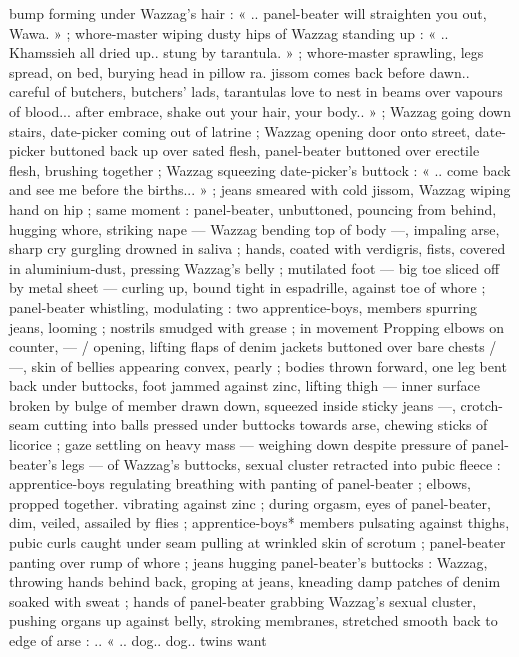 bump forming under Wazzag’s hair : « .. panel-beater will straighten
you out, Wawa. » ; whore-master wiping dusty hips of Wazzag
standing up : « .. Khamssieh all dried up.. stung by tarantula. » ;
whore-master sprawling, legs spread, on bed, burying head in pillow
ra. jissom comes back before dawn.. careful of butchers, butchers’
lads, tarantulas love to nest in beams over vapours of blood... after
embrace, shake out your hair, your body.. » ; Wazzag going down
stairs, date-picker coming out of latrine ; Wazzag opening door onto
street, date-picker buttoned back up over sated flesh, panel-beater
buttoned over erectile flesh, brushing together ; Wazzag squeezing
date-picker's buttock : « .. come back and see me before the births...
» ; jeans smeared with cold jissom, Wazzag wiping hand on hip ; same
moment : panel-beater, unbuttoned, pouncing from behind, hugging
whore, striking nape --- Wazzag bending top of body ---, impaling
arse, sharp cry gurgling drowned in saliva ; hands, coated with
verdigris, fists, covered in aluminium-dust, pressing Wazzag's belly ;
mutilated foot --- big toe sliced off by metal sheet --- curling up,
bound tight in espadrille, against toe of whore ; panel-beater
whistling, modulating : two apprentice-boys, members spurring
jeans, looming ; nostrils smudged with grease ; in movement
Propping elbows on counter, --- / opening, lifting flaps of denim
jackets buttoned over bare chests / ---, skin of bellies appearing
convex, pearly ; bodies thrown forward, one leg bent back under
buttocks, foot jammed against zinc, lifting thigh --- inner surface
broken by bulge of member drawn down, squeezed inside sticky
jeans ---, crotch-seam cutting into balls pressed under buttocks
towards arse, chewing sticks of licorice ; gaze settling on heavy mass
--- weighing down despite pressure of panel-beater's legs --- of
Wazzag's buttocks, sexual cluster retracted into pubic fleece :
apprentice-boys regulating breathing with panting of panel-beater ;
elbows, propped together. vibrating against zinc ; during orgasm,
eyes of panel-beater, dim, veiled, assailed by flies ; apprentice-boys*
members pulsating against thighs, pubic curls caught under seam
pulling at wrinkled skin of scrotum ; panel-beater panting over rump
of whore ; jeans hugging panel-beater's buttocks : Wazzag, throwing
hands behind back, groping at jeans, kneading damp patches of
denim soaked with sweat ; hands of panel-beater grabbing Wazzag's
sexual cluster, pushing organs up against belly, stroking membranes,
stretched smooth back to edge of arse : .. « .. dog.. dog.. twins want
